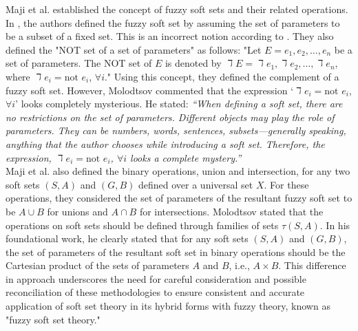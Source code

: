 \documentclass{article}
\theoremstyle{definition}
\begin{document}
Maji et al. \cite{7} established the concept of fuzzy soft sets and their related operations. In \cite{7}, the authors defined the fuzzy soft set by assuming the set of parameters to be a subset of a fixed set. This is an incorrect notion according to \cite{3, 4}. They also defined the "NOT set of a set of parameters" as follows: "Let $E={e_1, e_2, \dots, e_n}$ be a set of parameters. The NOT set of $E$ is denoted by $\daleth E ={\daleth e_1, \daleth e_2, \dots, \daleth e_n}$, where $\daleth e_i = \text{not } e_i$, $\forall i$." Using this concept, they defined the complement of a fuzzy soft set. However, Molodtsov commented \cite{3} that the expression `$\daleth e_i = \text{not } e_i$, $\forall i$' looks completely mysterious. He \cite{3} stated: \textit{“When defining a soft set, there are no restrictions on the set of parameters. Different objects may play the role of parameters. They can be numbers, words, sentences, subsets—generally speaking, anything that the author chooses while introducing a soft set. Therefore, the expression, $\daleth e_i = \text{not } e_i$, $\forall i$ looks a complete mystery.”}\\

Maji et al. \cite{7} also defined the binary operations, union and intersection, for any two soft sets $(S, A)$ and $(G, B)$ defined over a universal set $X$. For these operations, they considered the set of parameters of the resultant fuzzy soft set to be $A \cup B$ for unions and $A \cap B$ for intersections. Molodtsov \cite{2} stated that the operations on soft sets should be defined through families of sets $\tau(S,A)$. In his foundational work, he clearly stated that for any soft sets $(S, A)$ and $(G, B)$, the set of parameters of the resultant soft set in binary operations should be the Cartesian product of the sets of parameters $A$ and $B$, i.e., $A \times B$. This difference in approach underscores the need for careful consideration and possible reconciliation of these methodologies to ensure consistent and accurate application of soft set theory in its hybrid forms with fuzzy theory, known as "fuzzy soft set theory."
\\ 
\end{document}
